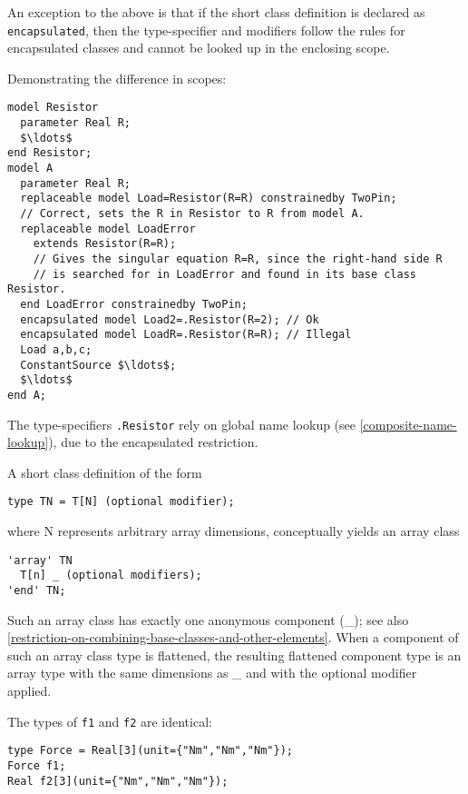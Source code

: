 An exception to the above is that if the short class definition is declared as \lstinline!encapsulated!, then the type-specifier and modifiers follow the rules for encapsulated classes and cannot be looked up in the enclosing scope.

\begin{example}
Demonstrating the difference in scopes:
\begin{lstlisting}[language=modelica]
model Resistor
  parameter Real R;
  $\ldots$
end Resistor;
model A
  parameter Real R;
  replaceable model Load=Resistor(R=R) constrainedby TwoPin;
  // Correct, sets the R in Resistor to R from model A.
  replaceable model LoadError
    extends Resistor(R=R);
    // Gives the singular equation R=R, since the right-hand side R
    // is searched for in LoadError and found in its base class Resistor.
  end LoadError constrainedby TwoPin;
  encapsulated model Load2=.Resistor(R=2); // Ok
  encapsulated model LoadR=.Resistor(R=R); // Illegal
  Load a,b,c;
  ConstantSource $\ldots$;
  $\ldots$
end A;
\end{lstlisting}
The type-specifiers \lstinline!.Resistor! rely on global name lookup (see \ref{composite-name-lookup}), due to the encapsulated restriction.
\end{example}

A short class definition of the form
\begin{lstlisting}[language=modelica]
type TN = T[N] (optional modifier);
\end{lstlisting}

where N represents arbitrary array dimensions, conceptually yields an
array class

\begin{lstlisting}[language=modelica]
'array' TN
  T[n] _ (optional modifiers);
'end' TN;
\end{lstlisting}

Such an array class has exactly one anonymous component (\_); see also \cref{restriction-on-combining-base-classes-and-other-elements}.
When a component of such an array class type is flattened, the resulting flattened component type is an array type with the same dimensions as \_ and with the optional modifier applied.

\begin{example}
The types of \lstinline!f1! and \lstinline!f2! are identical:
\begin{lstlisting}[language=modelica]
type Force = Real[3](unit={"Nm","Nm","Nm"});
Force f1;
Real f2[3](unit={"Nm","Nm","Nm"});
\end{lstlisting}
\end{example}

